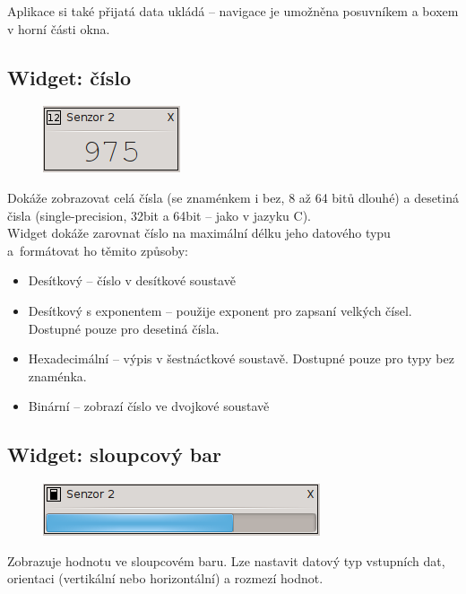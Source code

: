 \documentclass[12pt, a4paper, oneside]{article}
\begin{document}
Aplikace si také přijatá data ukládá -- navigace je umožněna posuvníkem a boxem v horní části okna.

\subsection*{Widget: číslo}
\begin{figure}[h]
\begin{center}
\includegraphics{img/w_num.png}
\end{center}
\end{figure}
Dokáže zobrazovat celá čísla (se znaménkem i bez, 8 až 64 bitů dlouhé) a desetiná čisla (single-precision\cite{float}, 32bit a 64bit -- jako v jazyku C).\\
Widget dokáže zarovnat číslo na maximální délku jeho datového typu\\a~formátovat ho těmito způsoby:
\begin{itemize}
    \item Desítkový -- číslo v desítkové soustavě
    \item Desítkový s exponentem -- použije exponent pro zapsaní velkých čísel. Dostupné pouze pro desetiná čísla.
    \item Hexadecimální -- výpis v šestnáctkové soustavě. Dostupné pouze pro typy bez znaménka. 
    \item Binární -- zobrazí číslo ve dvojkové soustavě
\end{itemize}

\newpage
{}
\subsection*{Widget: sloupcový bar}
\begin{figure}[h]
\begin{center}
\includegraphics{img/w_bar.png}
\end{center}
\end{figure}
Zobrazuje hodnotu ve sloupcovém baru. Lze nastavit datový typ vstupních dat, orientaci (vertikální nebo horizontální) a rozmezí hodnot.
\end{document}
